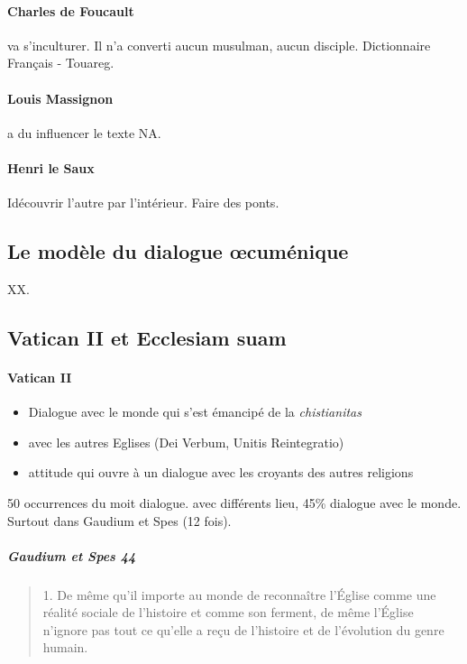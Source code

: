   \paragraph{Charles de Foucault} va s'inculturer. Il n'a converti aucun musulman, aucun disciple. Dictionnaire Français - Touareg. 
  
  \paragraph{Louis Massignon}  a du influencer le texte NA. 
  
  
  \paragraph{Henri le Saux} Idécouvrir l'autre par l'intérieur. Faire des ponts.
  
  
  \subsection{ Le modèle du dialogue œcuménique}
  XX.
  
  \subsection{Vatican II et Ecclesiam suam }
  
  
   \paragraph{Vatican II} 
 
   \begin{itemize}
       \item Dialogue avec le monde qui s'est émancipé de la \textit{chistianitas}
       \item avec les autres Eglises (Dei Verbum, Unitis Reintegratio)
       \item attitude qui ouvre à un dialogue avec les croyants des autres religions
    \end{itemize}
    
     50 occurrences du moit dialogue.  avec différents lieu, 45\% dialogue avec le monde. Surtout dans Gaudium et Spes (12 fois). 
       
    \subparagraph{Gaudium et Spes 44}
\begin{quote}
  1. De même qu’il importe au monde de reconnaître l’Église comme une réalité sociale de l’histoire et comme son ferment, de même l’Église n’ignore pas tout ce qu’elle a reçu de l’histoire et de l’évolution du genre humain.  
\end{quote}



